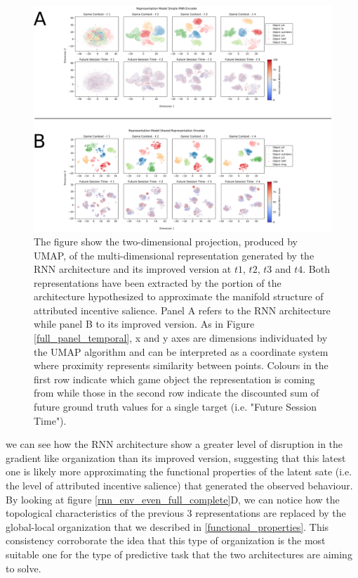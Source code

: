 \begin{figure}[ht]
\centering
\includegraphics[width=\textwidth]{images/chapter_4/rnn_predictive.png}
\caption[\textbf{Differences in predictive power between the representations generated by the RNN architecture and its improved version}]{The figure show the two-dimensional projection, produced by UMAP, of the multi-dimensional representation generated by the RNN architecture and its improved version at $t1$, $t2$, $t3$ and $t4$. Both representations have been extracted by the portion of the architecture hypothesized to approximate the manifold structure of attributed incentive salience. Panel A refers to the RNN architecture while panel B to its improved version. As in Figure \ref{full_panel_temporal}, x and y axes are dimensions individuated by the UMAP algorithm and can be interpreted as a coordinate system where proximity represents similarity between points. Colours in the first row indicate which game object the representation is coming from while those in the second row indicate the discounted sum of future ground truth values for a single target (i.e. "Future Session Time").}
\label{rnn_predictive_comparison}
\end{figure}

we can see how the RNN architecture show a greater level of disruption in the gradient like organization than its improved version, suggesting that this latest one is likely more  approximating the functional properties of the latent sate (i.e. the level of attributed incentive salience) that generated the observed behaviour. By looking at figure \ref{rnn_env_even_full_complete}D, we can notice how the topological characteristics of the previous 3 representations are replaced by the global-local organization that we described in \ref{functional_properties}. This consistency corroborate the idea that this type of organization is the most suitable one for the type of predictive task that the two architectures are aiming to solve.


